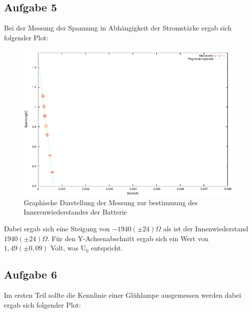 \documentclass[12pt]{scrartcl}
\begin{document}
\subsection{Aufgabe 5}
Bei der Messung der Spannung in Abhängigkeit der Stromstärke ergab sich folgender Plot:

\begin{figure}[htbp] 
	 \centering
	   \includegraphics[scale = 1]{Wiederstand.pdf}
	 	\caption[Graphische Darstellung der Messung zur bestimmung des Innerenwiederstandes der Batterie]{Graphische Darstellung der Messung zur bestimmung des Innerenwiederstandes der Batterie}
	 \label{fig:aufgabe_5_plot}
\end{figure}

Dabei ergab sich eine Steigung von $-1940 (\pm 24)\Omega$ als ist der Innenwiederstand $1940 (\pm 24)\Omega$.
Für den Y-Achsenabschnitt ergab sich ein Wert von $1,49	(\pm 0,09)$ Volt, was U$_0$ entspricht.

\newpage

\subsection{Aufgabe 6}
Im ersten Teil sollte die Kennlinie einer Glühlampe ausgemessen werden dabei ergab sich folgender Plot:
\end{document}
